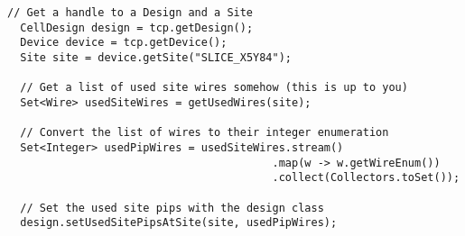 \begin{lstlisting}[xleftmargin=1.5em, framexleftmargin=1.5em, caption=Code
to transform a set of SiteWires into Site PIPs, label=code:sitePips]
  // Get a handle to a Design and a Site
  CellDesign design = tcp.getDesign();
  Device device = tcp.getDevice();
  Site site = device.getSite("SLICE_X5Y84");

  // Get a list of used site wires somehow (this is up to you)
  Set<Wire> usedSiteWires = getUsedWires(site);

  // Convert the list of wires to their integer enumeration
  Set<Integer> usedPipWires = usedSiteWires.stream()
										 .map(w -> w.getWireEnum())
										 .collect(Collectors.toSet());

  // Set the used site pips with the design class
  design.setUsedSitePipsAtSite(site, usedPipWires);
\end{lstlisting}